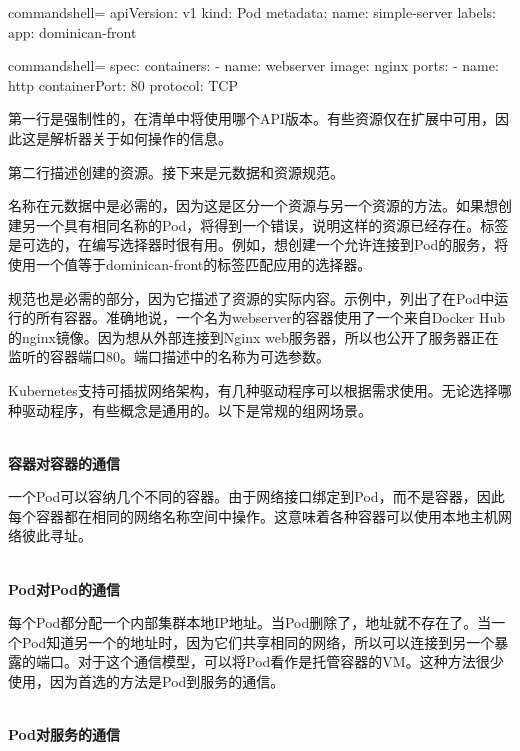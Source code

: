 \begin{tcblisting}{commandshell={}}
apiVersion: v1
kind: Pod
metadata:
  name: simple-server
  labels:
    app: dominican-front
\end{tcblisting}
\begin{tcblisting}{commandshell={}}
spec:
  containers:
    - name: webserver
      image: nginx
      ports:
        - name: http
          containerPort: 80
          protocol: TCP
\end{tcblisting}

第一行是强制性的，在清单中将使用哪个API版本。有些资源仅在扩展中可用，因此这是解析器关于如何操作的信息。 

第二行描述创建的资源。接下来是元数据和资源规范。

名称在元数据中是必需的，因为这是区分一个资源与另一个资源的方法。如果想创建另一个具有相同名称的Pod，将得到一个错误，说明这样的资源已经存在。标签是可选的，在编写选择器时很有用。例如，想创建一个允许连接到Pod的服务，将使用一个值等于dominican-front的标签匹配应用的选择器。

规范也是必需的部分，因为它描述了资源的实际内容。示例中，列出了在Pod中运行的所有容器。准确地说，一个名为webserver的容器使用了一个来自Docker Hub的nginx镜像。因为想从外部连接到Nginx web服务器，所以也公开了服务器正在监听的容器端口80。端口描述中的名称为可选参数。


Kubernetes支持可插拔网络架构，有几种驱动程序可以根据需求使用。无论选择哪种驱动程序，有些概念是通用的。以下是常规的组网场景。

\hspace*{\fill} \\ %
\noindent
\textbf{容器对容器的通信}

一个Pod可以容纳几个不同的容器。由于网络接口绑定到Pod，而不是容器，因此每个容器都在相同的网络名称空间中操作。这意味着各种容器可以使用本地主机网络彼此寻址。

\hspace*{\fill} \\ %
\noindent
\textbf{Pod对Pod的通信}

每个Pod都分配一个内部集群本地IP地址。当Pod删除了，地址就不存在了。当一个Pod知道另一个的地址时，因为它们共享相同的网络，所以可以连接到另一个暴露的端口。对于这个通信模型，可以将Pod看作是托管容器的VM。这种方法很少使用，因为首选的方法是Pod到服务的通信。

\hspace*{\fill} \\ %
\noindent
\textbf{Pod对服务的通信}


